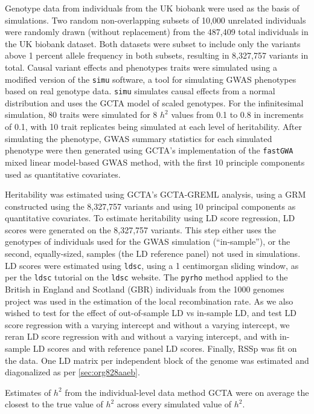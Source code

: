Genotype data from individuals from the UK biobank were used as the basis of simulations. Two random non-overlapping subsets of 10,000 unrelated individuals were randomly drawn (without replacement) from the 487,409 total individuals in the UK biobank dataset.  Both datasets were subset to include only the variants above 1 percent allele frequency in both subsets, resulting in 8,327,757 variants in total.
Causal variant effects and phenotypes traits were simulated using a modified version of the \texttt{simu} software, a tool for simulating GWAS phenotypes based on real genotype data.  \texttt{simu} simulates causal effects from a normal distribution and uses the GCTA model of scaled genotypes. For the infinitesimal simulation, 80 traits were simulated for 8 $h^2$ values from  0.1 to 0.8 in increments of 0.1, with 10 trait replicates being simulated at each level of heritability. After simulating the phenotype, GWAS summary statistics for each simulated phenotype were then generated using GCTA's implementation of the \texttt{fastGWA} mixed linear model-based GWAS method, with the first 10 principle components used as quantitative covariates. 

Heritability was estimated using GCTA's GCTA-GREML analysis, using a GRM constructed using the 8,327,757 variants and using 10 principal components as quantitative covariates. 
To estimate heritability using LD score regression, LD scores were generated on the 8,327,757 variants.  This step either uses the genotypes of individuals used for the GWAS simulation (``in-sample''), or the second, equally-sized, samples (the LD reference panel) not used in simulations.  LD scores were estimated using \texttt{ldsc}, using a 1 centimorgan sliding window, as per the \texttt{ldsc} tutorial \cite{ldsctutorial} on the \texttt{ldsc} website.  The \texttt{pyrho} method applied to the British in England and Scotland (GBR) individuals from the 1000 genomes project\cite{1kg} was used in the estimation of the local recombination rate.  As we also wished to test for the effect of out-of-sample LD vs in-sample LD, and test LD score regression with a varying intercept and without a varying intercept, we reran LD score regression with and without a varying intercept, and with in-sample LD scores and with reference panel LD scores.  Finally, RSSp was fit on the data. One LD matrix per independent block of the genome was estimated and diagonalized as per \ref{sec:org828aaeb}.  


Estimates of $h^2$ from the individual-level data method GCTA were on average the closest to the true value of $h^2$ across every simulated value of $h^2$. 

